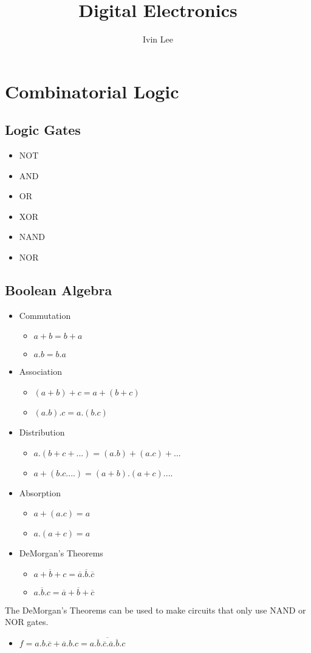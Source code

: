 \documentclass[12pt,a4paper]{article} %
\author{Ivin Lee}
\title{Digital Electronics}
\begin{document}
\maketitle
\section{Combinatorial Logic}
\subsection{Logic Gates}
\begin{itemize}
\item NOT 
\item AND
\item OR
\item XOR
\item NAND
\item NOR
\end{itemize}
\subsection{Boolean Algebra}
\begin{itemize}
\item Commutation
	\begin{itemize}
	\item $a + b = b + a$
	\item $a.b = b.a$
	\end{itemize}
\item Association
	\begin{itemize}
	\item $(a+b)+c = a+(b+c)$
	\item $(a.b).c = a.(b.c)$
	\end{itemize}
\item Distribution
	\begin{itemize}
	\item $a.(b+c+...) = (a.b)+(a.c)+...$
	\item $a+(b.c....) = (a+b).(a+c)....$
	\end{itemize}
\item Absorption
	\begin{itemize}
	\item $a+(a.c) = a$
	\item $a.(a+c) = a$
	\end{itemize}
\item DeMorgan's Theorems
	\begin{itemize}
	\item $\overline{a+b+c} = \overline{a}.\overline{b}.\overline{c}$
	\item $\overline{a.b.c} = \overline{a}+\overline{b}+\overline{c}$
	\end{itemize}
\end{itemize}
The DeMorgan's Theorems can be used to make circuits that only use NAND or NOR gates.
\begin{itemize}
\item $f=a.b.\overline{c}+\overline{a}.b.c = \overline{\overline{a.b.\overline{c}}.\overline{\overline{a}.b.c}}$
\end{itemize}
\end{document}
